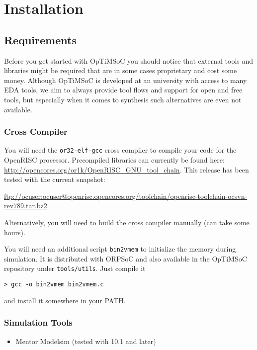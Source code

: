 \chapter{Installation}
\label{chap:getstarted}

\section{Requirements}
\label{sec:getstarted-requirements}

Before you get started with OpTiMSoC you should notice that external
tools and libraries might be required that are in some cases
proprietary and cost some money. Although OpTiMSoC is developed at an
university with access to many EDA tools, we aim to always provide
tool flows and support for open and free tools, but especially when it
comes to synthesis such alternatives are even not available.

\subsection{Cross Compiler}
\label{sec:getstarted-requirements-crosscompiler}

You will need the \verb|or32-elf-gcc| cross compiler to compile your
code for the OpenRISC processor. Precompiled libraries can currently
be found here:
\url{http://opencores.org/or1k/OpenRISC_GNU_tool_chain}. This release
has been tested with the current snapshot:

\url{ftp://ocuser:ocuser@openrisc.opencores.org/toolchain/openrisc-toolchain-ocsvn-rev789.tar.bz2}

Alternatively, you will need to build the cross compiler manually (can
take some hours).

You will need an additional script \verb|bin2vmem| to initialize the
memory during simulation. It is distributed with ORPSoC and also
available in the OpTiMSoC repository under \verb|tools/utils|. Just
compile it

\begin{verbatim}
> gcc -o bin2vmem bin2vmem.c
\end{verbatim}

and install it somewhere in your PATH.

\subsection{Simulation Tools}

\begin{itemize}
\item Mentor Modelsim (tested with 10.1 and later)
\end{itemize}

